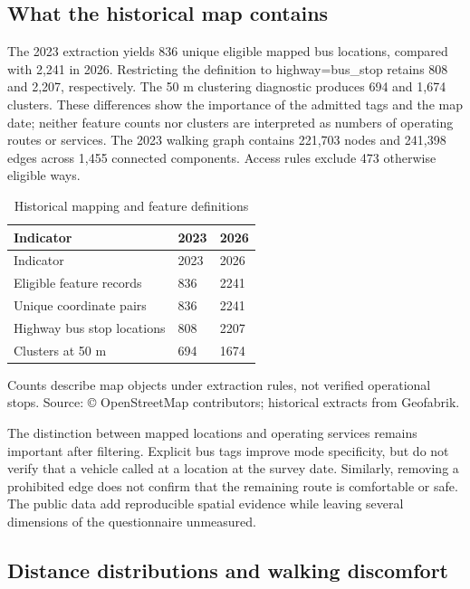 \documentclass[
  11pt,
  a4paper,
]{article}
\begin{document}
\subsection{What the historical map
contains}\label{what-the-historical-map-contains}

The 2023 extraction yields 836 unique eligible mapped bus locations,
compared with 2,241 in 2026. Restricting the definition to
highway=bus\_stop retains 808 and 2,207, respectively. The 50 m
clustering diagnostic produces 694 and 1,674 clusters. These differences
show the importance of the admitted tags and the map date; neither
feature counts nor clusters are interpreted as numbers of operating
routes or services. The 2023 walking graph contains 221,703 nodes and
241,398 edges across 1,455 connected components. Access rules exclude
473 otherwise eligible ways.

\begin{longtable}[]{@{}lll@{}}
\caption{Historical mapping and feature definitions}\tabularnewline
\toprule\noalign{}
Indicator & 2023 & 2026 \\
\midrule\noalign{}
\endfirsthead
\toprule\noalign{}
Indicator & 2023 & 2026 \\
\midrule\noalign{}
\endhead
\bottomrule\noalign{}
\endlastfoot
Eligible feature records & 836 & 2241 \\
Unique coordinate pairs & 836 & 2241 \\
Highway bus stop locations & 808 & 2207 \\
Clusters at 50 m & 694 & 1674 \\
\end{longtable}

Counts describe map objects under extraction rules, not verified
operational stops. Source: © OpenStreetMap contributors; historical
extracts from Geofabrik.

The distinction between mapped locations and operating services remains
important after filtering. Explicit bus tags improve mode specificity,
but do not verify that a vehicle called at a location at the survey
date. Similarly, removing a prohibited edge does not confirm that the
remaining route is comfortable or safe. The public data add reproducible
spatial evidence while leaving several dimensions of the questionnaire
unmeasured.

\subsection{Distance distributions and walking
discomfort}\label{distance-distributions-and-walking-discomfort}
\end{document}
